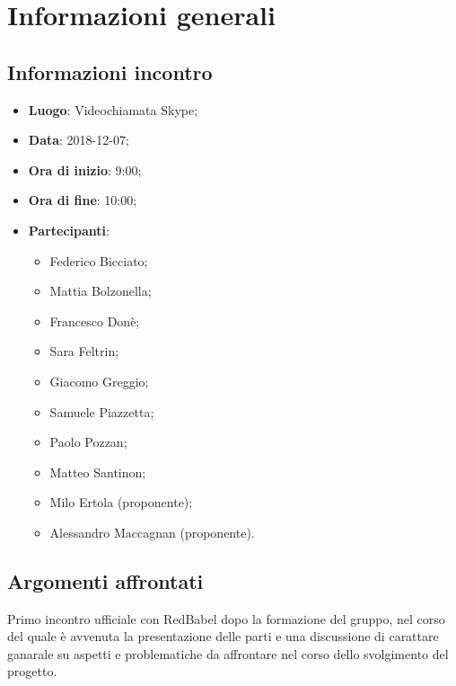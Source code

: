 \section{Informazioni generali}

\subsection{Informazioni incontro}
\begin{itemize}
\item \textbf{Luogo}: Videochiamata Skype;
\item \textbf{Data}: 2018-12-07;
\item \textbf{Ora di inizio}: 9:00;
\item \textbf{Ora di fine}: 10:00;
\item \textbf{Partecipanti}: 
	\begin{itemize}
		\item Federico Bicciato;
		\item Mattia Bolzonella;
		\item Francesco Donè;
		\item Sara Feltrin;
		\item Giacomo Greggio;
		\item Samuele Piazzetta;
		\item Paolo Pozzan;
		\item Matteo Santinon;
		\item Milo Ertola (proponente);
		\item Alessandro Maccagnan (proponente).
	\end{itemize}
\end{itemize}

\subsection{Argomenti affrontati}
Primo incontro ufficiale con RedBabel dopo la formazione del gruppo, nel corso del quale è avvenuta la presentazione delle parti e una discussione di carattare ganarale su aspetti e problematiche da affrontare nel corso dello svolgimento del progetto.

